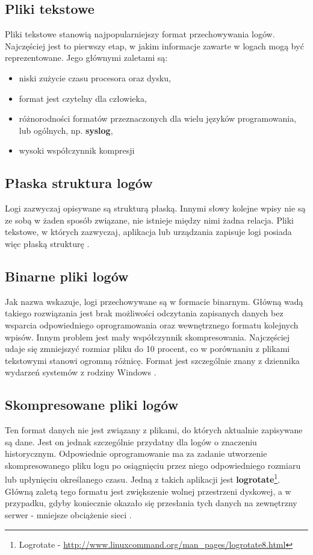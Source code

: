     \subsection{Pliki tekstowe}
    Pliki tekstowe stanowią najpopularniejszy format przechowywania logów. Najczęściej jest to 
    pierwszy etap, w jakim informacje zawarte w logach mogą być reprezentowane. Jego głównymi zaletami są:
    \begin{itemize}
        \item niski zużycie czasu procesora oraz dysku,
        \item format jest czytelny dla człowieka,
        \item różnorodności formatów przeznaczonych dla wielu języków programowania,
        lub ogólnych, np. \textbf{syslog},
        \item wysoki współczynnik kompresji \cite{logging_log_management}
    \end{itemize}
    
    \subsection{Płaska struktura logów}
    Logi zazwyczaj opisywane są strukturą płaską. Innymi słowy kolejne wpisy nie są ze sobą w żaden sposób
    związane, nie istnieje między nimi żadna relacja. Pliki tekstowe, w których zazwyczaj, aplikacja lub
    urządzania zapisuje logi posiada więc płaską strukturę \cite{logging_log_management}.
    
    \subsection{Binarne pliki logów}
    Jak nazwa wskazuje, logi przechowywane są w formacie binarnym. Główną wadą takiego
    rozwiązania jest brak możliwości odczytania zapisanych danych bez wsparcia odpowiedniego
    oprogramowania oraz wewnętrznego formatu kolejnych wpisów. Innym problem jest mały współczynnik
    skompresowania. Najczęściej udaje się zmniejszyć rozmiar pliku do 10 procent, co w
    porównaniu z plikami tekstowymi stanowi ogromną różnicę.
    Format jest szczególnie znany z dziennika wydarzeń systemów z rodziny Windows \cite{logging_log_management}.
    
    \subsection{Skompresowane pliki logów}
    \label{chapter:logs:history:compressed_log_format}
    Ten format danych nie jest związany z plikami, do których aktualnie zapisywane są dane.
    Jest on jednak szczególnie przydatny dla logów o znaczeniu historycznym. Odpowiednie
    oprogramowanie ma za zadanie utworzenie skompresowanego pliku logu po osiągnięciu przez niego
    odpowiedniego rozmiaru lub upłynięciu określanego czasu. Jedną z takich aplikacji jest 
    \textbf{logrotate}\footnote{Logrotate - \url{http://www.linuxcommand.org/man_pages/logrotate8.html}}.
    Główną zaletą tego formatu jest zwiększenie wolnej przestrzeni dyskowej, a w przypadku, gdyby koniecznie
    okazało się przesłania tych danych na zewnętrzny serwer - mniejsze obciążenie sieci \cite{logging_log_management}.
 
